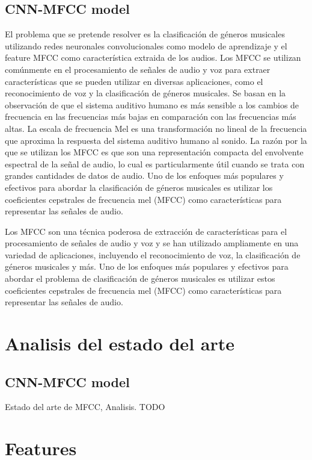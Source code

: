 \documentclass[colorinlistoftodos,twoside,twocolumn,10pt]{article} %
\begin{document}
\subsection {CNN-MFCC model}
    El problema que se pretende resolver es la clasificaci\'on de g\'eneros musicales utilizando redes neuronales convolucionales como modelo de aprendizaje y el feature MFCC como caracter\'istica extraida de los audios.
    Los MFCC se utilizan comúnmente en el procesamiento de señales de audio y voz para extraer características que se pueden utilizar en diversas aplicaciones, como el reconocimiento de voz y la clasificación de géneros musicales. Se basan en la observación de que el sistema auditivo humano es más sensible a los cambios de frecuencia en las frecuencias más bajas en comparación con las frecuencias más altas. La escala de frecuencia Mel es una transformación no lineal de la frecuencia que aproxima la respuesta del sistema auditivo humano al sonido. La razón por la que se utilizan los MFCC es que son una representación compacta del envolvente espectral de la señal de audio, lo cual es particularmente útil cuando se trata con grandes cantidades de datos de audio.
    Uno de los enfoques más populares y efectivos para abordar la clasificación de géneros musicales es utilizar los coeficientes cepstrales de frecuencia mel (MFCC) como características para representar las señales de audio.

    Los MFCC son una técnica poderosa de extracción de características para el procesamiento de señales de audio y voz y se han utilizado ampliamente en una variedad de aplicaciones, incluyendo el reconocimiento de voz, la clasificación de géneros musicales y más.
    Uno de los enfoques más populares y efectivos para abordar el problema de clasificación de géneros musicales es utilizar estos coeficientes cepstrales de frecuencia mel (MFCC) como características para representar las señales de audio.

\section {Analisis del estado del arte}
\subsection {CNN-MFCC model}
Estado del arte de MFCC, Analisis. TODO

\section {Features}
\end{document}
